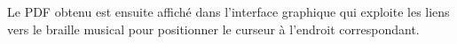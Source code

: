 
Le PDF obtenu est ensuite affiché dans l'interface graphique qui
exploite les liens vers le braille musical pour positionner le curseur
à l'endroit correspondant.
